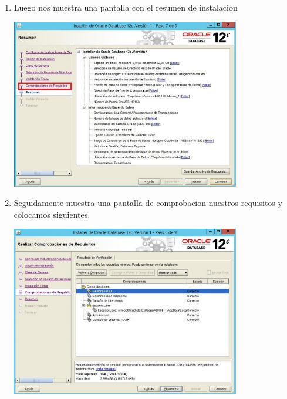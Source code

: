 \begin{enumerate}[1.]
\begin{center}
	\end{center}
          \item Luego nos muestra una pantalla con el resumen de instalacion
 	\begin{center}
	\includegraphics[width=10cm]{./Imagenes/bran7} 
	\end{center}
	\hfill \break
	\hfill \break
	\hfill \break
	\hfill \break
	\hfill \break
	\hfill \break
	\hfill \break
	\hfill \break
	\hfill \break
	\hfill \break
	\hfill \break
	\hfill \break
           \item Seguidamente muestra una pantalla de comprobacion nuestros requisitos y colocamos siguientes.
 	\begin{center}
	\includegraphics[width=10cm]{./Imagenes/bran8} 
	\end{center}



\end{enumerate}
